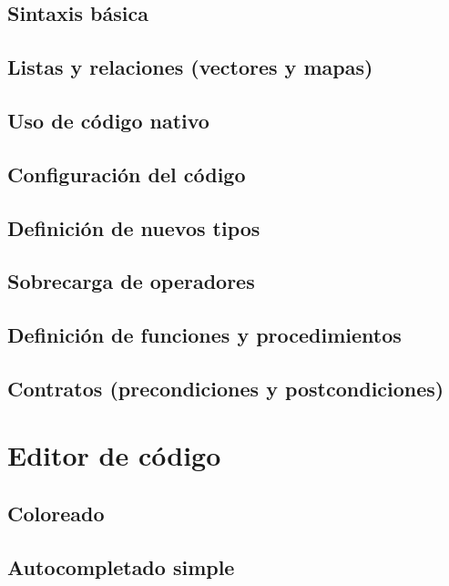 \documentclass{report}
\begin{document}
	\subsection{Sintaxis básica}
	
	\subsection{Listas y relaciones (vectores y mapas)}
	
	\subsection{Uso de código nativo}
	
	\subsection{Configuración del código}
	
	\subsection{Definición de nuevos tipos}
	
	\subsection{Sobrecarga de operadores}
	
	\subsection{Definición de funciones y procedimientos}
	
	\subsection{Contratos (precondiciones y postcondiciones)}
	
	\section{Editor de código}
	
	\subsection{Coloreado}
	
	\subsection{Autocompletado simple}
	
\end{document}
